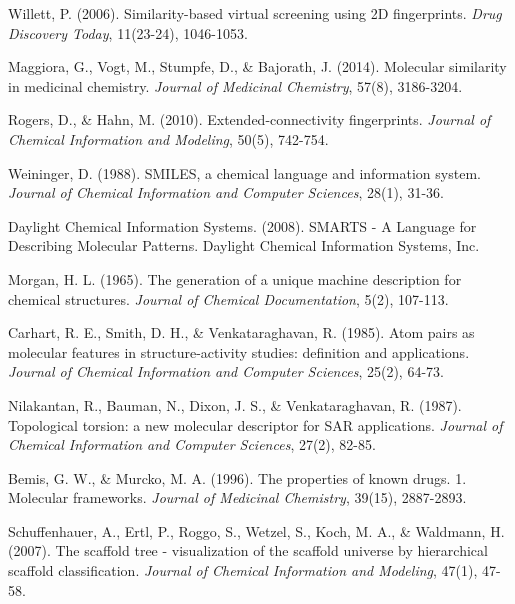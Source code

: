 \documentclass[12pt,a4paper]{article}
\begin{document}

\begin{thebibliography}{99}

Willett, P. (2006). Similarity-based virtual screening using 2D fingerprints. \textit{Drug Discovery Today}, 11(23-24), 1046-1053.

Maggiora, G., Vogt, M., Stumpfe, D., \& Bajorath, J. (2014). Molecular similarity in medicinal chemistry. \textit{Journal of Medicinal Chemistry}, 57(8), 3186-3204.

Rogers, D., \& Hahn, M. (2010). Extended-connectivity fingerprints. \textit{Journal of Chemical Information and Modeling}, 50(5), 742-754.

Weininger, D. (1988). SMILES, a chemical language and information system. \textit{Journal of Chemical Information and Computer Sciences}, 28(1), 31-36.

Daylight Chemical Information Systems. (2008). SMARTS - A Language for Describing Molecular Patterns. Daylight Chemical Information Systems, Inc.

Morgan, H. L. (1965). The generation of a unique machine description for chemical structures. \textit{Journal of Chemical Documentation}, 5(2), 107-113.

Carhart, R. E., Smith, D. H., \& Venkataraghavan, R. (1985). Atom pairs as molecular features in structure-activity studies: definition and applications. \textit{Journal of Chemical Information and Computer Sciences}, 25(2), 64-73.

Nilakantan, R., Bauman, N., Dixon, J. S., \& Venkataraghavan, R. (1987). Topological torsion: a new molecular descriptor for SAR applications. \textit{Journal of Chemical Information and Computer Sciences}, 27(2), 82-85.

Bemis, G. W., \& Murcko, M. A. (1996). The properties of known drugs. 1. Molecular frameworks. \textit{Journal of Medicinal Chemistry}, 39(15), 2887-2893.

Schuffenhauer, A., Ertl, P., Roggo, S., Wetzel, S., Koch, M. A., \& Waldmann, H. (2007). The scaffold tree - visualization of the scaffold universe by hierarchical scaffold classification. \textit{Journal of Chemical Information and Modeling}, 47(1), 47-58.


\end{thebibliography}
\end{document}
